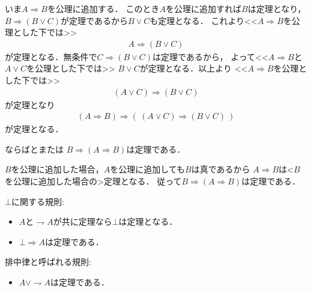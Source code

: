 	\begin{prf}
		いま$A \Longrightarrow B$を公理に追加する．
		このとき$A$を公理に追加すれば$B$は定理となり，
		$B \Longrightarrow (B \vee C)$が定理であるから$B \vee C$も定理となる．
		これより<<$A \Longrightarrow B$を公理とした下では>>
		\begin{align}
			A \Longrightarrow (B \vee C)
		\end{align}
		が定理となる．無条件で$C \Longrightarrow (B \vee C)$は定理であるから，
		よって<<$A \Longrightarrow B$と$A \vee C$を公理とした下では>>
		$B \vee C$が定理となる．以上より
		<<$A \Longrightarrow B$を公理とした下では>>
		\begin{align}
			(A \vee C) \Longrightarrow (B \vee C)
		\end{align}
		が定理となり
		\begin{align}
			(A \Longrightarrow B) \Longrightarrow 
			(\ (A \vee C) \Longrightarrow (B \vee C)\ )
		\end{align}
		が定理となる．
	\end{prf}
	
	\begin{itembox}[l]{ならばとまたは}
		$B \Longrightarrow (A \Longrightarrow B)$は定理である．
	\end{itembox}
	
	\begin{prf}
		$B$を公理に追加した場合，$A$を公理に追加しても$B$は真であるから
		$A \Longrightarrow B$は<$B$を公理に追加した場合の>定理となる．
		従って$B \Longrightarrow (A \Longrightarrow B)$は定理である．
	\end{prf}
	
	\begin{screen}
		\begin{schema}[公理図式群B]
			$\bot$に関する規則:
			\begin{itemize}
				\item $A$と$\rightharpoondown A$が共に定理なら$\bot$は定理となる．
				\item $\bot \Longrightarrow A$は定理である．
			\end{itemize}
		\end{schema}
	\end{screen}
	
	\begin{screen}
		\begin{schema}
			排中律と呼ばれる規則:
			\begin{itemize}
				\item $A \vee \rightharpoondown A$は定理である．
			\end{itemize}
		\end{schema}
	\end{screen}
	
